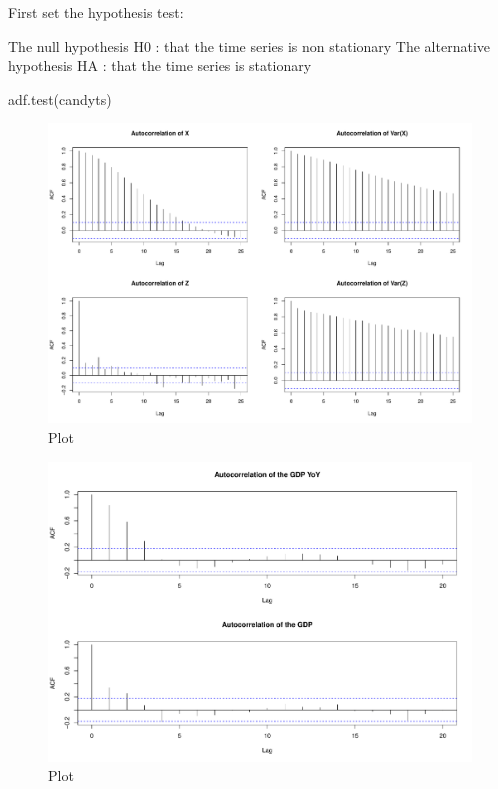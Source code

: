 \documentclass[12pt,a4paper,oneside]{book}
\begin{document}
First set the hypothesis test:

The null hypothesis H0 : that the time series is non stationary The alternative hypothesis HA : that the time series is stationary

adf.test(candyts)

\begin{figure}[H]
    \centering
    \captionsetup{justification=centering}
    \includegraphics[scale=0.5]{Graphs/ACF.pdf}
    \caption{Plot }
    \label{fig:ACF}
\end{figure}

\begin{figure}[H]
    \centering
    \captionsetup{justification=centering}
    \includegraphics[scale=0.45]{Graphs/ACF_GDP.pdf}
    \caption{Plot }
    \label{fig:ACF_GDP}
\end{figure}
\end{document}
